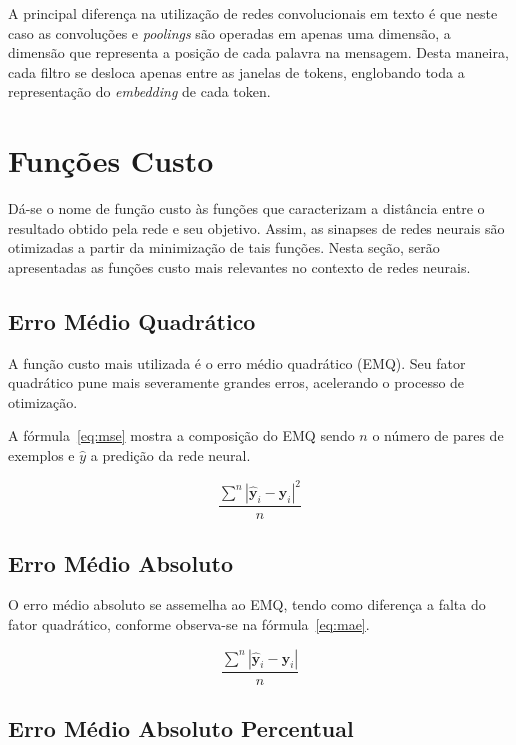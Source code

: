 A principal diferença na utilização de redes convolucionais em texto é que neste caso as convoluções e \textit{poolings}
são operadas em apenas uma dimensão, a dimensão que representa a posição de cada palavra na mensagem.
Desta maneira, cada filtro se desloca apenas entre as janelas de tokens, englobando toda a representação do
\textit{embedding} de cada token.

\section{Funções Custo} \label{sec:custo}

Dá-se o nome de função custo às funções que caracterizam a distância entre o resultado obtido pela rede e seu objetivo.
Assim, as sinapses de redes neurais são otimizadas a partir da minimização de tais funções.
Nesta seção, serão apresentadas as funções custo mais relevantes no contexto de redes neurais.

\subsection{Erro Médio Quadrático}

A função custo mais utilizada é o erro médio quadrático (EMQ). Seu fator quadrático pune mais severamente grandes erros, acelerando o processo de otimização.

A fórmula~\ref{eq:mse} mostra a composição do EMQ sendo $n$ o número de pares de exemplos e $\hat{y}$ a predição da rede neural.

\begin{equation} \label{eq:mse}
    \frac{\displaystyle\sum^n |\hat{\mathbf{y}}_i - \mathbf{y}_i|^2}{n}
\end{equation}

\subsection{Erro Médio Absoluto}

O erro médio absoluto se assemelha ao EMQ, tendo como diferença a falta do fator quadrático, conforme observa-se na fórmula~\ref{eq:mae}.

\begin{equation} \label{eq:mae}
    \frac{\displaystyle\sum^n |\hat{\mathbf{y}}_i - \mathbf{y}_i|}{n}
\end{equation}

\subsection{Erro Médio Absoluto Percentual}

